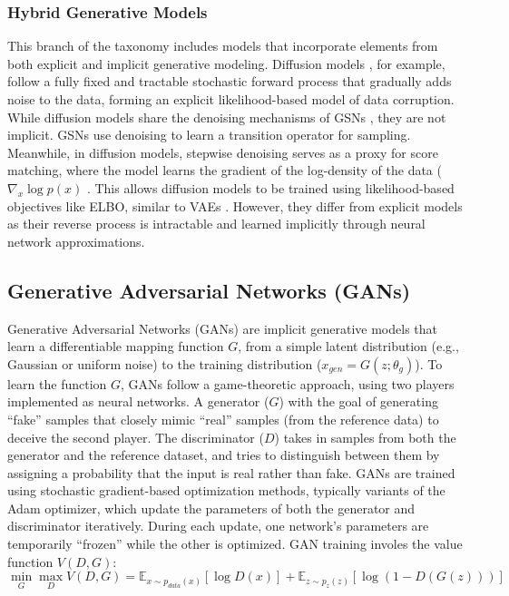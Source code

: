 \subsubsection*{Hybrid Generative Models}
This branch of the taxonomy includes models that incorporate elements from both explicit and implicit generative modeling. Diffusion models \cite{ho2020denoising}, for example, follow a fully fixed and tractable stochastic forward process that gradually adds noise to the data, forming an explicit likelihood-based model of data corruption. While diffusion models share the denoising mechanisms of GSNs \cite{alain2016gsns}, they are not implicit. GSNs use denoising to learn a transition operator for sampling. Meanwhile, in diffusion models, stepwise denoising serves as a proxy for score matching, where the model learns the gradient of the log-density of the data ($\nabla_x \log p(x)$ \cite{song2019generative}. This allows diffusion models to be trained using likelihood-based objectives like ELBO, similar to VAEs \cite{kingma2013auto}. However, they differ from explicit models as their reverse process is intractable and learned implicitly through neural network approximations.

\subsection*{Generative Adversarial Networks (GANs)}
Generative Adversarial Networks (GANs) \cite{goodfellow2014generative} are implicit generative models that learn a differentiable mapping function $G$, from a simple latent distribution (e.g., Gaussian or uniform noise) to the training distribution ($x_{gen} = G(z; \theta_g)$). To learn the function $G$, GANs follow a game-theoretic approach, using two players implemented as neural networks. A generator ($G$) with the goal of generating “fake” samples that closely mimic “real” samples (from the reference data) to deceive the second player. The discriminator ($D$) takes in samples from both the generator and the reference dataset, and tries to distinguish between them by assigning a probability that the input is real rather than fake. GANs are trained using stochastic gradient-based optimization methods, typically variants of the Adam optimizer, which update the parameters of both the generator and discriminator iteratively. During each update, one network’s parameters are temporarily “frozen” while the other is optimized. GAN training involes the value function $V(D, G)$:
\[\min_{G} \max_{D} V(D, G) = \mathbb{E}_{x \sim p_{data}(x)}[\log D(x)] + \mathbb{E}_{z \sim p_{z}(z)}[\log(1 - D(G(z)))]\]

